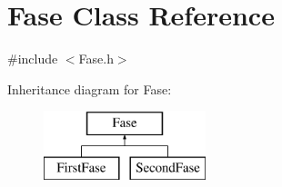 \hypertarget{class_fase}{}\section{Fase Class Reference}
\label{class_fase}


{\ttfamily \#include $<$Fase.\+h$>$}

Inheritance diagram for Fase\+:\begin{figure}[H]
\begin{center}
\leavevmode
\includegraphics[height=2.000000cm]{class_fase}
\end{center}
\end{figure}
